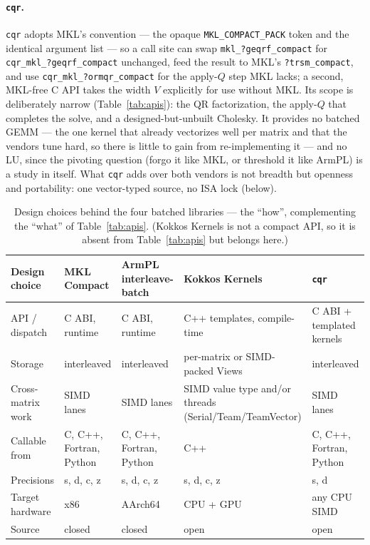 \documentclass[11pt]{article}
\newcommand{\code}[1]{\texttt{#1}}
\newcommand{\cqr}{\mbox{\texttt{cqr}}}
\begin{document}
\paragraph{\cqr{}.}
\cqr{} adopts MKL's convention --- the opaque \code{MKL\_COMPACT\_PACK} token and
the identical argument list --- so a call site can swap \code{mkl\_?geqrf\_compact}
for \code{cqr\_mkl\_?geqrf\_compact} unchanged, feed the result to MKL's
\code{?trsm\_compact}, and use \code{cqr\_mkl\_?ormqr\_compact} for the apply-$Q$
step MKL lacks; a second, MKL-free C API takes the width $V$ explicitly for use
without MKL. Its scope is deliberately narrow (Table~\ref{tab:apis}): the QR
factorization, the apply-$Q$ that completes the solve, and a designed-but-unbuilt
Cholesky. It provides no batched GEMM --- the one kernel that already vectorizes
well per matrix and that the vendors tune hard, so there is little to gain from
re-implementing it --- and no LU, since the pivoting question (forgo it like MKL,
or threshold it like ArmPL) is a study in itself. What \cqr{} adds over both
vendors is not breadth but openness and portability: one vector-typed source, no
ISA lock (below).

\begin{table}[t]
\centering
\caption{Design choices behind the four batched libraries --- the ``how'',
complementing the ``what'' of Table~\ref{tab:apis}. (Kokkos Kernels is not a
compact API, so it is absent from Table~\ref{tab:apis} but belongs here.)}
\label{tab:design}
\footnotesize
\begin{tabularx}{\linewidth}{@{}l XXXX@{}}
\toprule
Design choice & MKL Compact & ArmPL interleave-batch & Kokkos Kernels & \cqr{} \\
\midrule
API / dispatch      & C ABI, runtime & C ABI, runtime & C++ templates, compile-time & C ABI + templated kernels \\
Storage             & interleaved & interleaved & per-matrix or SIMD-packed Views & interleaved \\
Cross-matrix work   & SIMD lanes & SIMD lanes & SIMD value type and/or threads (Serial/Team/TeamVector) & SIMD lanes \\
Callable from       & C, C++, Fortran, Python & C, C++, Fortran, Python & C++ & C, C++, Fortran, Python \\
Precisions          & s, d, c, z & s, d, c, z & s, d, c, z & s, d \\
Target hardware     & x86 & AArch64 & CPU + GPU & any CPU SIMD \\
Source              & closed & closed & open & open \\
\bottomrule
\end{tabularx}
\end{table}
\end{document}
